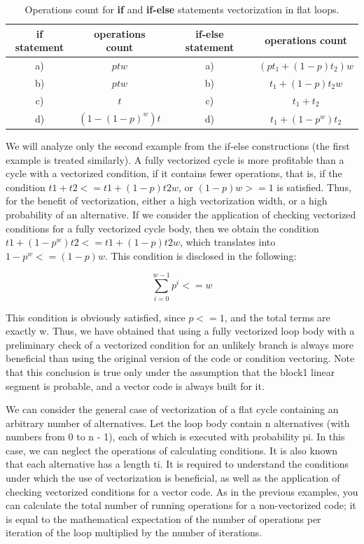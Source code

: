 \documentclass[
11pt,%
tightenlines,%
twoside,%
onecolumn,%
nofloats,%
nobibnotes,%
nofootinbib,%
superscriptaddress,%
noshowpacs,%
centertags]%
{revtex4}
\begin{document}
\begin{table}[!h]
\setcaptionmargin{0mm}
\onelinecaptionsfalse
{}
\caption{Operations count for \textbf{if} and \textbf{if-else} statements vectorization in flat loops.}
\bigskip
\begin{tabular}{|c|c|c|c|}
\hline
\textbf{if} statement & operations count & \textbf{if-else} statement & operations count \\
\hline
a) & $ptw$ & a) & $\left( pt_1 + (1 - p)t_2 \right)w$ \\
b) & $ptw$ & b) & $t_1 + (1 - p)t_2w$ \\
c) & $t$ & c) & $t_1 + t_2$ \\
d) & $\left( 1 - (1 - p)^w \right)t$ & d) & $t_1 + (1 - p^w)t_2$ \\
\hline
\end{tabular}
\end{table}

We will analyze only the second example from the if-else constructions (the first example is treated similarly). A fully vectorized cycle is more profitable than a cycle with a vectorized condition, if it contains fewer operations, that is, if the condition $t1 + t2 <= t1 + (1 - p) t2w$, or $(1 - p) w >= 1$ is satisfied. Thus, for the benefit of vectorization, either a high vectorization width, or a high probability of an alternative. If we consider the application of checking vectorized conditions for a fully vectorized cycle body, then we obtain the condition $t1 + (1 - p ^ w) t2 <= t1 + (1 - p) t2w$, which translates into $1 - p ^ w <= (1 - p) w$. This condition is disclosed in the following:

\begin{equation}
\sum_{i = 0}^{w - 1}{p^i} <= w
\end{equation}

This condition is obviously satisfied, since $p <= 1$, and the total terms are exactly w. Thus, we have obtained that using a fully vectorized loop body with a preliminary check of a vectorized condition for an unlikely branch is always more beneficial than using the original version of the code or condition vectoring. Note that this conclusion is true only under the assumption that the block1 linear segment is probable, and a vector code is always built for it.

We can consider the general case of vectorization of a flat cycle containing an arbitrary number of alternatives. Let the loop body contain n alternatives (with numbers from 0 to n - 1), each of which is executed with probability pi. In this case, we can neglect the operations of calculating conditions. It is also known that each alternative has a length ti. It is required to understand the conditions under which the use of vectorization is beneficial, as well as the application of checking vectorized conditions for a vector code. As in the previous examples, you can calculate the total number of running operations for a non-vectorized code; it is equal to the mathematical expectation of the number of operations per iteration of the loop multiplied by the number of iterations.
\end{document}
